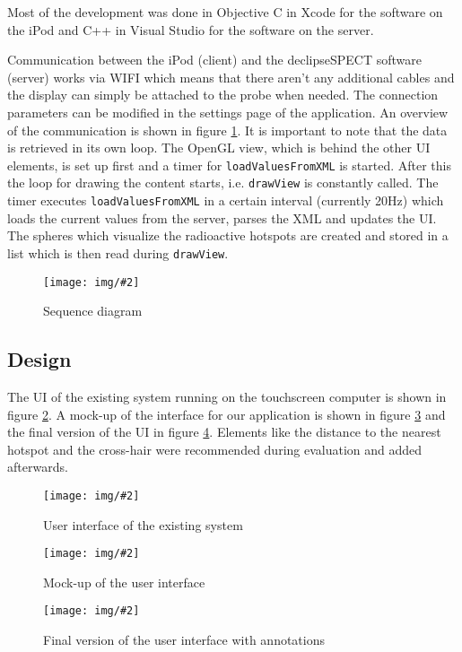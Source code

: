 \documentclass{scrartcl}
\newcommand{\graphic}[3][width=\linewidth] %
{
  \begin{figure}[h!t]
    \centering
    \texttt{[image: img/\#2]}
    \caption{#3}
    \label{fig:#2}
  \end{figure}
}
\newcommand{\refFigure}[1]{figure \ref{fig:#1}}
\begin{document}
Most of the development was done in Objective C in Xcode for the software on the iPod and C++ in Visual Studio for the software on the server.

Communication between the iPod (client) and the declipseSPECT software (server) works via WIFI which means that there aren't any additional cables and the display can simply be attached to the probe when needed. The connection parameters can be modified in the settings page of the application.
An overview of the communication is shown in \refFigure{sequence-diagram}. It is important to note that the data is retrieved in its own loop. The OpenGL view, which is behind the other UI elements, is set up first and a timer for \verb|loadValuesFromXML| is started. After this the loop for drawing the content starts, i.e. \verb|drawView| is constantly called. The timer executes \verb|loadValuesFromXML| in a certain interval (currently 20Hz) which loads the current values from the server, parses the XML and updates the UI. The spheres which visualize the radioactive hotspots are created and stored in a list which is then read during \verb|drawView|.
\graphic[scale=.8]{sequence-diagram}{Sequence diagram}


\subsection{Design}
The UI of the existing system running on the touchscreen computer is shown in \refFigure{server2}.
A mock-up of the interface for our application is shown in \refFigure{mockup} and the final version of the UI in \refFigure{screen-annotated}. Elements like the distance to the nearest hotspot and the cross-hair were recommended during evaluation and added afterwards.
\graphic[scale=.43]{server2}{User interface of the existing system}
\graphic[scale=.5]{mockup}{Mock-up of the user interface}
\graphic[scale=.5]{screen-annotated}{Final version of the user interface with annotations}
\end{document}
